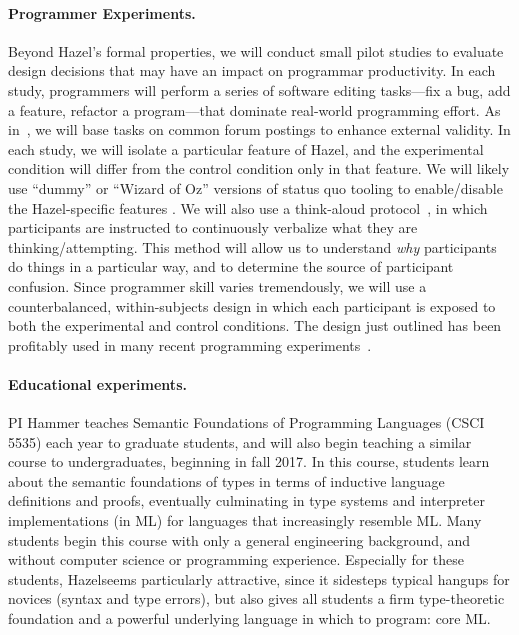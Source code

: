 \documentclass[letterpaper,USenglish]{lipics-v2016}
\newcommand{\Hazel}[0]{\textsf{Hazel}}
\newcommand{\HazelEnv}[0]{\Hazel}
\begin{document}
\paragraph{Programmer Experiments.} 
%
Beyond \Hazel's formal properties, we will conduct small pilot studies to
evaluate design decisions that may have an impact on programmar productivity. 
%
In each study, programmers will perform a series of software editing 
tasks---fix a bug, add a feature, refactor a program---that dominate 
real-world programming effort. As in~\cite{sunshine14plaiddoc}, 
we will base tasks on common forum postings to enhance external validity. In 
each study, we will isolate a particular feature of \Hazel, and the experimental 
condition will differ from the control condition only in that feature. We will 
likely use ``dummy'' or ``Wizard of Oz''  versions of status quo tooling to 
enable/disable the \HazelEnv-specific features \cite{wizard-of-oz}. We will also use 
a think-aloud protocol~\cite{think-aloud-protocol}, in which participants are 
instructed to continuously verbalize what they are thinking/attempting. This 
method will allow us to understand \textit{why} participants do things in a 
particular way, and to determine the source of participant confusion. Since 
programmer skill varies tremendously, we will use a counterbalanced, 
within-subjects design in which each participant is exposed to both the 
experimental and control conditions. 
The design just outlined has been profitably used in many recent programming 
experiments~\cite{stylos-constructor-params, static-typing-apidoc, benefits-generic-types}.



\paragraph{Educational experiments.} 
%
PI Hammer teaches Semantic Foundations of Programming Languages (CSCI
5535) each year to graduate students, and will also begin teaching a
similar course to undergraduates, beginning in fall 2017.
%
In this course, students learn about the semantic foundations of types
in terms of inductive language definitions and proofs, eventually
culminating in type systems and interpreter implementations (in ML)
for languages that increasingly resemble ML.
%
Many students begin this course with only a general engineering
background, and without computer science or programming experience.
Especially for these students, \Hazel seems particularly attractive,
since it sidesteps typical hangups for novices (syntax and type
errors), but also gives all students a firm type-theoretic foundation
and a powerful underlying language in which to program: core ML.
\end{document}
